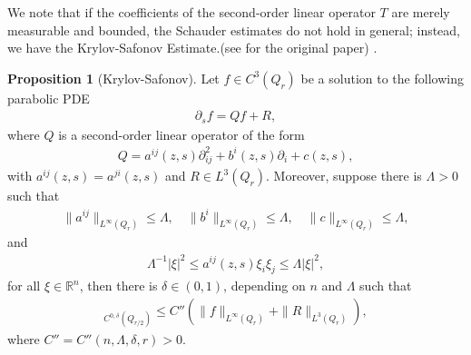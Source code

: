 \documentclass[11pt,reqno]{amsart}
\theoremstyle{definition}
\theoremstyle{bfremark}
\newtheorem{proposition}{Proposition}[section]
\numberwithin{equation}{section}
\begin{document}
We note that if the coefficients of the second-order linear operator \(T\) are merely measurable and bounded, the Schauder estimates do not hold in general; instead, we have the Krylov-Safonov Estimate.(see \cite{krylov1981certain} for the original paper) .

\begin{proposition}[Krylov-Safonov]
\label{prop:Krylov-Safonov}
    Let \(f \in C^3(Q_r)\) be a solution to the following parabolic PDE
    \begin{align*}
        \partial_sf=Qf+R,
    \end{align*}
    where \(Q\) is a second-order linear operator of the form 
    \begin{align*}
       Q=a^{ij}(z,s)\partial^2_{ij}+b^i(z,s)\partial_i+c(z,s),
    \end{align*}
    with \(a^{ij}(z,s)=a^{ji}(z,s)\) and \(R \in L^3(Q_r)\). Moreover, suppose there is \(\Lambda>0\) such that
    \begin{align*}
        \|a^{ij}\|_{L^{\infty}(Q_{r})} \leq \Lambda, \quad \|b^i\|_{L^{\infty}(Q_r)} \leq \Lambda, \quad \|c\|_{L^{\infty}(Q_r)} \leq \Lambda,
    \end{align*}
    and 
    \begin{align*}
        \Lambda^{-1}|\xi|^2 \leq a^{ij}(z,s)\xi_i \xi_j \leq \Lambda|\xi|^2,
    \end{align*}
    for all \(\xi \in \mathbb{R}^n\), then there is \(\delta \in (0,1)\), depending on \(n\) and \(\Lambda\) such that
    \begin{align*}
        [f]_{C^{0,\delta}(Q_{r/2})} \leq C''\left(\|f\|_{L^{\infty}(Q_{r})}+\|R\|_{L^3(Q_{r})}\right),
    \end{align*}
    where \(C''=C''(n,\Lambda,\delta,r)>0\).
\end{proposition}
\end{document}
